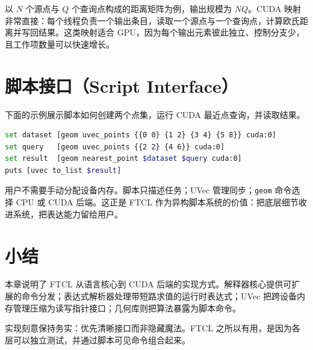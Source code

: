 以 \(N\) 个源点与 \(Q\) 个查询点构成的距离矩阵为例，输出规模为 \(NQ\)。CUDA 映射非常直接：每个线程负责一个输出条目，读取一个源点与一个查询点，计算欧氏距离并写回结果。这类映射适合 GPU，因为每个输出元素彼此独立、控制分支少，且工作项数量可以快速增长。

\section{脚本接口（Script Interface）}
下面的示例展示脚本如何创建两个点集，运行 CUDA 最近点查询，并读取结果。

\begin{lstlisting}[language=bash,caption={FTCL geometry scripting example}]
set dataset [geom uvec_points {{0 0} {1 2} {3 4} {5 8}} cuda:0]
set query   [geom uvec_points {{2 2} {4 6}} cuda:0]
set result  [geom nearest_point $dataset $query cuda:0]
puts [uvec to_list $result]
\end{lstlisting}

用户不需要手动分配设备内存。脚本只描述任务；UVec 管理同步；\texttt{geom} 命令选择 CPU 或 CUDA 后端。这正是 FTCL 作为异构脚本系统的价值：把底层细节收进系统，把表达能力留给用户。

\begin{algorithm}[H]
\caption{Geometry Command Dispatch for Nearest-point Query}
\label{alg:geom-dispatch}
\end{algorithm}

\section{小结}
本章说明了 FTCL 从语言核心到 CUDA 后端的实现方式。解释器核心提供可扩展的命令分发；表达式解析器处理带短路求值的运行时表达式；UVec 把跨设备内存管理压缩为读写指针接口；几何库则把算法暴露为脚本命令。

实现刻意保持务实：优先清晰接口而非隐藏魔法。FTCL 之所以有用，是因为各层可以独立测试，并通过脚本可见命令组合起来。
